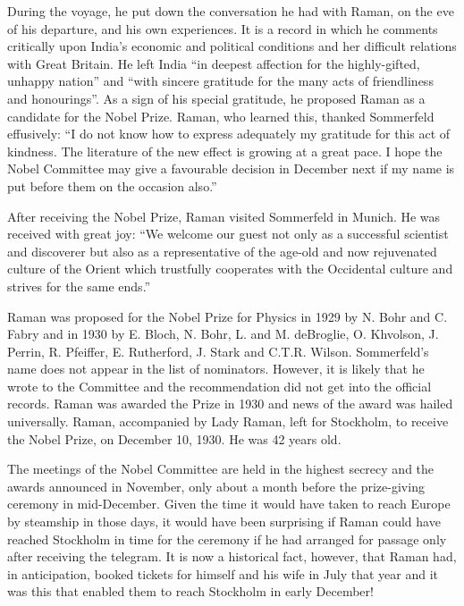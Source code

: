 During the voyage, he put down the conversation he had
with Raman, on the eve of his departure, and his own
experiences. It is a record in which he comments critically upon
India's economic and political conditions and her difficult
relations with Great Britain. He left India ``in deepest affection
for the highly-gifted, unhappy nation'' and ``with sincere
gratitude for the many acts of friendliness and honourings''. As a
sign of his special gratitude, he proposed Raman as a candidate
for the Nobel Prize. Raman, who learned this, thanked
Sommerfeld effusively: ``I do not know how to express adequately
my gratitude for this act of kindness. The literature of the new
effect is growing at a great pace. I hope the Nobel Committee
may give a favourable decision in December next if my name is
put before them on the occasion also.''

After receiving the Nobel Prize, Raman visited Sommerfeld
in Munich. He was received with great joy: ``We welcome our
guest not only as a successful scientist and discoverer but also
as a representative of the age-old and now rejuvenated culture
of the Orient which trustfully cooperates with the Occidental
culture and strives for the same ends.''

Raman was proposed for the Nobel Prize for Physics in 1929
by N. Bohr and C. Fabry and in 1930 by E. Bloch, N. Bohr,
L. and M. deBroglie, O. Khvolson, J. Perrin, R. Pfeiffer,
E. Rutherford, J. Stark and C.T.R. Wilson. Sommerfeld's
name does not appear in the list of nominators. However, it is
likely that he wrote to the Committee and the recommendation
did not get into the official records. Raman was awarded the Prize
in 1930 and news of the award was hailed universally. Raman,
accompanied by Lady Raman, left for Stockholm, to receive the
Nobel Prize, on December 10, 1930. He was 42 years old.

The meetings of the Nobel Committee are held in the highest
secrecy and the awards announced in November, only about a
month before the prize-giving ceremony in mid-December. Given
the time it would have taken to reach Europe by steam\-ship in
those days, it would have been surprising if Raman could have
reached Stockholm in time for the ceremony if he had arranged
for passage only after receiving the telegram. It is now a historical
fact, however, that \hbox{Raman} had, in anticipation, booked tickets
for himself and his wife in July that year and it was this that enabled them to reach Stockholm in early December!

